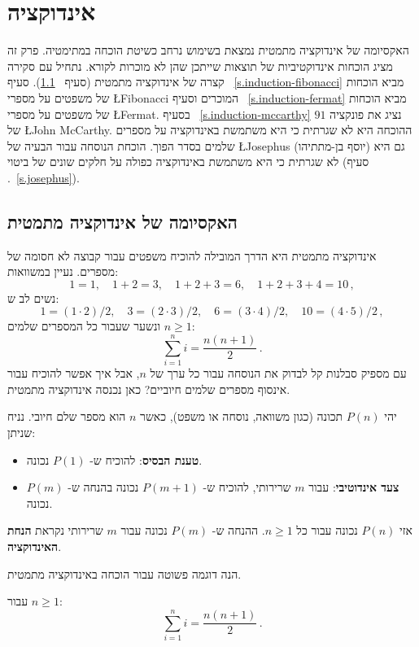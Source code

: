 

\chapter{אינדוקציה}\label{c.induction}


האקסיומה של אינדוקציה מתמטית נמצאת בשימוש נרחב כשיטת הוכחה במתימטיה. פרק זה מציג הוכחות אינדוקטיביות של תוצאות שייתכן שהן לא מוכרות לקורא. נתחיל עם סקירה קצרה של אינדוקציה מתמטית (סעיף%
~\ref{s.induction-axiom}).
סעיף%
~\ref{s.induction-fibonacci}
מביא הוכחות של משפטים על מספרי
\L{Fibonacci}
המוכרים וסעיף%
~\ref{s.induction-fermat}
מביא הוכחות של משפטים על מספרי
\L{Fermat}.
בסעיף%
~\ref{s.induction-mccarthy}
נציג את פונקציה
$91$
של 
\L{John McCarthy}.
ההוכחה היא לא שגרתית כי היא משתמשת באינדוקציה על מספרים שלמים בסדר הפוך. הוכחת הנוסחה עבור הבעיה של
\L{Josephus}
(יוסף בן-מתתיהו) גם היא לא שגרתית כי היא משתמשת באינדוקציה כפולה על חלקים שונים של ביטוי (סעיף%
.~\ref{s.josephus}).

\section{האקסיומה של אינדוקציה מתמטית}\label{s.induction-axiom}

אינדוקציה מתמטית היא הדרך המובילה להוכיח משפטים עבור קבוצה לא חסומה של מספרים. נעיין במשוואות:
\[
1=1,\quad 1+2=3,\quad 1+2+3=6,\quad 1+2+3+4=10\,,
\]
נשים לב ש:
\[
1=(1\cdot 2)/2,\quad 3=(2\cdot 3)/2,\quad  6=(3\cdot 4)/2,\quad 10=(4\cdot 5)/2\,,
\]
ונשער שעבור כל המספרים שלמים
$n\geq 1$:
\[
\sum_{i=1}^n i = \frac{n(n+1)}{2}\,.
\]
עם מספיק סבלנות קל לבדוק את הנוסחה עבור כל ערך של
$n$,
אבל איך אפשר להוכיח עבור אינסוף מספרים שלמים חיוביים? כאן נכנסה אינדוקציה מתמטית.

\begin{axiom}
יהי
$P(n)$
תכונה (כגון משוואה, נוסחה או משפט), כאשר 
$n$
הוא מספר שלם חיובי. נניח שניתן:
\begin{itemize}
\item \textbf{טענת הבסיס}: 
להוכיח ש-%
$P(1)$
נכונה.
\item \textbf{צעד אינדוטיבי}:
עבור 
$m$
שרירותי, להוכיח ש-%
$P(m+1)$
נכונה בהנחה ש-%
$P(m)$
נכונה.
\end{itemize}
אזי
$P(n)$
נכונה עבור כל
$n\geq 1$.
ההנחה ש-%
$P(m)$
נכונה עבור 
$m$ 
שרירותי נקראת
\textbf{הנחת האינדוקציה}.
\end{axiom}
הנה דוגמה פשוטה עבור הוכחה באינדוקציה מתמטית.
\begin{theorem}\label{t.sum}
עבור
$n\geq 1$:
\[
\sum_{i=1}^n i = \frac{n(n+1)}{2}\,.
\]
\end{theorem}

